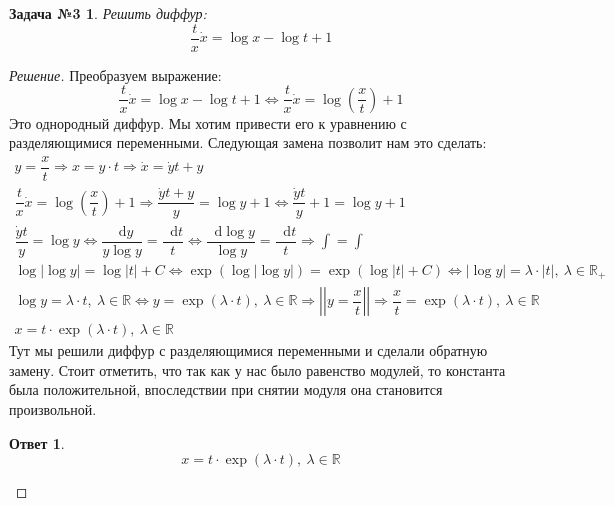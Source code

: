 \documentclass[a4paper,12pt]{article}
\newtheorem*{task3}{Задача №3}
\newtheorem*{ans}{Ответ}
\newcommand{\R}{\mathbb{R}}
\renewcommand*\d{\mathop{}\!\mathrm{d}}
\newcommand{\dy}{\dot{y}}
\newcommand{\dx}{\dot{x}}
\newcommand{\bto}{\Longrightarrow}
\newcommand{\ds}{\displaystyle}
\begin{document}
\begin{task3}
	Решить диффур: \[\dfrac{t}{x}\dx = \log x - \log t + 1\]
\end{task3}
\begin{proof}[Решение]
	Преобразуем выражение:
	\[\dfrac{t}{x}\dx = \log x - \log t + 1 \iff \dfrac{t}{x}\dx = \log(\dfrac{x}{t}) + 1\]
	Это однородный диффур. Мы хотим привести его к уравнению с разделяющимися переменными. Следующая замена позволит нам это сделать:
	\begin{gather*}
	y = \dfrac{x}{t} \Longrightarrow x = y\cdot t \Longrightarrow \dx = \dy t + y \\
	\dfrac{t}{x}\dx = \log(\dfrac{x}{t}) + 1 \Longrightarrow \dfrac{\dy t + y}{y} = \log y + 1 \iff \dfrac{\dy t}{y} + 1 = \log y + 1\\
	\dfrac{\dy t}{y} = \log y \iff \dfrac{\d y}{y\log y} = \dfrac{\d t}{t} \iff \dfrac{\d \log y}{\log y} = \dfrac{\d t}{t} \bto \ds\int = \int\\
	\log|\log y| = \log|t| + C \iff \exp(\log|\log y|) = \exp(\log|t| + C) \iff |\log y| = \lambda \cdot |t|,\ \lambda \in \R_+\\
	\log y = \lambda \cdot t,\ \lambda \in \R \iff y = \exp(\lambda\cdot t) ,\ \lambda \in \R \bto \left|\left|y = \dfrac{x}{t}\right|\right| \bto  \dfrac{x}{t} = \exp(\lambda\cdot t) ,\ \lambda \in \R\\
	x = t\cdot \exp(\lambda\cdot t),\ \lambda \in \R
	\end{gather*}
	Тут мы решили диффур с разделяющимися переменными и сделали обратную замену. Стоит отметить, что так как у нас было равенство модулей, то константа была положительной, впоследствии при снятии модуля она становится произвольной.
	\begin{ans}
		\[x = t\cdot \exp(\lambda\cdot t),\ \lambda \in \R\]
	\end{ans}
\end{proof}
\end{document}
